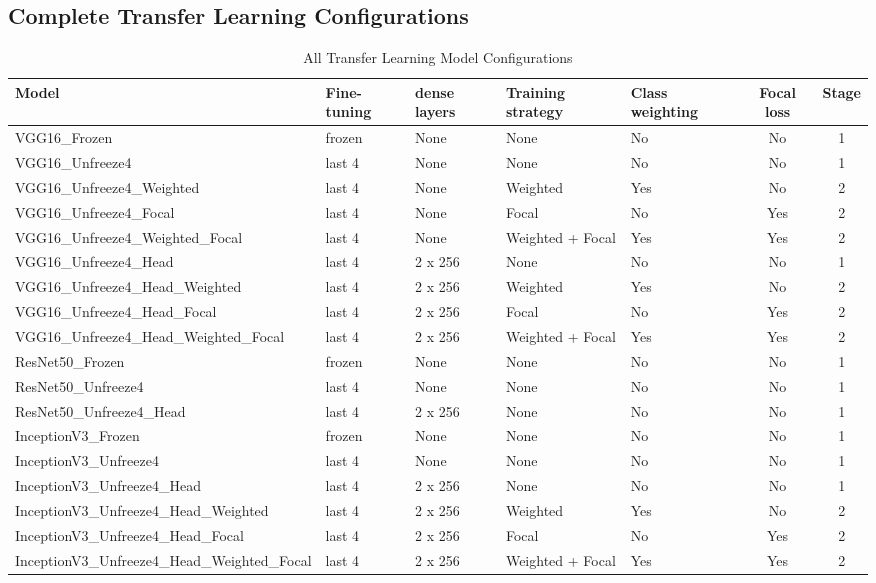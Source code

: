 \documentclass[12pt, a4paper]{report}
\let\oldsubsection\subsection
\renewcommand{\subsection}{%
    \Needspace{6\baselineskip}%
    \oldsubsection
}
\begin{document}
			\begin{landscape}
				\subsection{Complete Transfer Learning Configurations}
					\begin{table}[H]
						\centering
						\caption{All Transfer Learning Model Configurations}
						\label{tab:all_tl_configurations}
						\begin{tabularx}{\linewidth}{lXXXXcc}
							\toprule
							Model & Fine-tuning & dense layers & Training strategy & Class weighting & Focal loss & Stage \\
							\midrule
							VGG16\_Frozen & frozen & None & None & No & No & 1 \\
							VGG16\_Unfreeze4 & last 4 & None & None & No & No & 1 \\
							VGG16\_Unfreeze4\_Weighted & last 4 & None & Weighted & Yes & No & 2 \\
							VGG16\_Unfreeze4\_Focal & last 4 & None & Focal & No & Yes & 2 \\
							VGG16\_Unfreeze4\_Weighted\_Focal & last 4 & None & Weighted + Focal & Yes & Yes & 2 \\
							VGG16\_Unfreeze4\_Head & last 4 & 2 x 256 & None & No & No & 1 \\
							VGG16\_Unfreeze4\_Head\_Weighted & last 4 & 2 x 256 & Weighted & Yes & No & 2 \\
							VGG16\_Unfreeze4\_Head\_Focal & last 4 & 2 x 256 & Focal & No & Yes & 2 \\
							VGG16\_Unfreeze4\_Head\_Weighted\_Focal & last 4 & 2 x 256 & Weighted + Focal & Yes & Yes & 2 \\
							ResNet50\_Frozen & frozen & None & None & No & No & 1 \\
							ResNet50\_Unfreeze4 & last 4 & None & None & No & No & 1 \\
							ResNet50\_Unfreeze4\_Head & last 4 & 2 x 256 & None & No & No & 1 \\
							InceptionV3\_Frozen & frozen & None & None & No & No & 1 \\
							InceptionV3\_Unfreeze4 & last 4 & None & None & No & No & 1 \\
							InceptionV3\_Unfreeze4\_Head & last 4  & 2 x 256 & None & No & No & 1 \\
							InceptionV3\_Unfreeze4\_Head\_Weighted & last 4 & 2 x 256 & Weighted & Yes & No & 2 \\
							InceptionV3\_Unfreeze4\_Head\_Focal & last 4 & 2 x 256 & Focal & No & Yes & 2 \\
							InceptionV3\_Unfreeze4\_Head\_Weighted\_Focal & last 4 & 2 x 256 & Weighted + Focal & Yes & Yes & 2 \\
							\bottomrule
						\end{tabularx}
					\end{table}
			\end{landscape}
	
\end{document}
